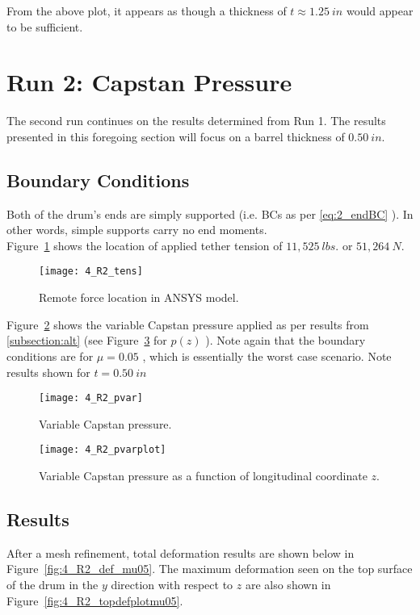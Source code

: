 From the above plot, it appears as though a thickness of $t \approx 1.25 \ in$ would appear to be sufficient.

\section{Run 2: Capstan Pressure}

The second run continues on the results determined from Run 1. The results presented in this foregoing section will focus on a barrel thickness of $0.50\ in$.

\subsection{Boundary Conditions}

Both of the drum's ends are simply supported (i.e. BCs as per \ref{eq:2_endBC} ). In other words, simple supports carry no end moments.\\

Figure~\ref{fig:4_R2_tens} shows the location of applied tether tension of $11,525\ lbs.$ or $51,264\ N$.
\begin{figure}[H]
	\centering
	\texttt{[image: 4\_R2\_tens]}
	\caption{Remote force location in ANSYS model.}
	\label{fig:4_R2_tens}
\end{figure}

Figure~\ref{fig:4_R2_pvar} shows the variable Capstan pressure applied as per results from \ref{subsection:alt} (see Figure~\ref{fig:4_R2_pvarplot} for $p(z)$ ). Note again that the boundary conditions are for $\mu=0.05$ , which is essentially the worst case scenario. Note results shown for $t=0.50\ in$

\begin{figure}[H]
	\centering
	\texttt{[image: 4\_R2\_pvar]}
	\caption{Variable Capstan pressure.}
	\label{fig:4_R2_pvar}
\end{figure}
\begin{figure}[H]
	\centering
	\texttt{[image: 4\_R2\_pvarplot]}
	\caption{Variable Capstan pressure as a function of longitudinal coordinate $z$.}
	\label{fig:4_R2_pvarplot}
\end{figure}


\subsection{Results}

After a mesh refinement, total deformation results are shown below in Figure~\ref{fig:4_R2_def_mu05}. The maximum deformation seen on the top surface of the drum in the $y$ direction with respect to $z$ are also shown in Figure~\ref{fig:4_R2_topdefplotmu05}.

